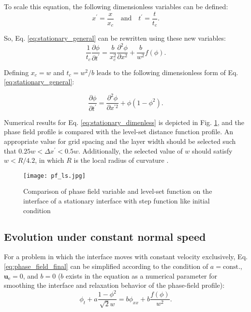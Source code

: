 To scale this equation, the following dimensionless variables can be defined:
\begin{equation} \label{eq:dimenless_variables}
x^\prime = \frac{x}{x_c} \quad \text{and} \quad t^\prime = \frac{t}{t_c}.
\end{equation}

So, Eq. \ref{eq:stationary_general} can be rewritten using these new variables:
\begin{equation} 
\frac{1}{t_{c}} \frac{\partial \phi}{\partial t^{\prime}}=\frac{b}{x_{c}^{2}} \frac{\partial^{2} \phi}{\partial x^{2}}+\frac{b}{w^{2}} f(\phi).
\end{equation}

Defining $x_c = w$ and $t_c=w^2/b$ leads to the following dimensionless form of Eq. \ref{eq:stationary_general}:

\begin{equation} \label{eq:stationary_dimenless}
\frac{\partial \phi}{\partial t^{\prime}}=\frac{\partial^{2} \phi}{\partial x^{\prime 2}}+\phi\left(1-\phi^{2}\right).
\end{equation}

Numerical results for Eq. \ref{eq:stationary_dimenless} is depicted in Fig.  \ref{fig:fig:pf_ls}, and the phase field profile is compared with the level-set distance function profile. An appropriate value for grid spacing and the layer width should be selected such that $0.25 w < \Delta x^\prime < 0.5 w $. Additionally, the selected value of $w$ should satisfy $w < R/4.2$, in which $R$ is the local radius of curvature \cite{Sun2007}.

\begin{figure}
\medskip
\centering
\texttt{[image: pf\_ls.jpg]}
\caption[Comparison of phase field variable and level-set function]{Comparison of phase field variable and level-set function on the interface of a stationary interface with step function like initial condition \cite{Sun2007}}
\label{fig:fig:pf_ls}
\end{figure}


\subsection{Evolution under constant normal speed}

For a problem in which the interface moves with constant velocity exclusively, Eq. \ref{eq:phase_field_final} can be simplified according to the condition of $a=\text{const.}$, $\boldsymbol{u}_{\mathrm{e}}=0$, and $b=0$ ($b$ exists in the equation as a numerical parameter for smoothing the interface and relaxation behavior of the phase-field profile):
\begin{equation}
\phi_{t}+a \frac{1-\phi^{2}}{\sqrt{2} w}=b \phi_{xx} + b\frac{f(\phi)}{w^{2}}.
\end{equation}

